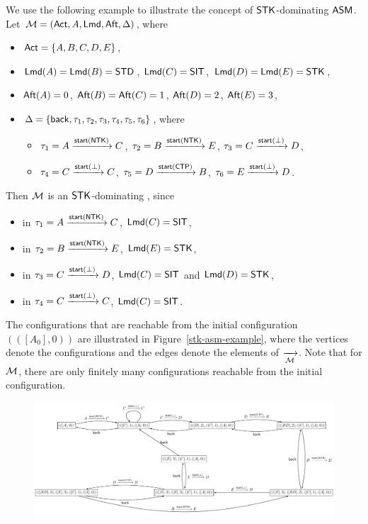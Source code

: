 \begin{example}
		We  use the following example to illustrate the concept of $\mathsf{STK}$-dominating $\textsf{ASM}$.
		Let ${\mathcal{M} }=({\sf Act},A,{\sf Lmd},{\sf Aft},\Delta)$, where 
		\begin{itemize}
			\item ${\sf Act} = \{A, B, C, D, E\}$, 
			\item ${\sf Lmd}(A)={\sf Lmd}(B)={\sf STD}$, ${\sf Lmd}(C) = {\sf SIT}$, ${\sf Lmd}(D) = {\sf Lmd}(E) = {\sf STK}$, 
			\item ${\sf Aft}(A) = 0$, ${\sf Aft}(B) = {\sf Aft}(C) = 1$, ${\sf Aft}(D) = 2$, ${\sf Aft}(E) = 3$, 
			\item $\Delta = \{{\mathsf{back} },\tau_1, \tau_2, \tau_3, \tau_4, \tau_5, \tau_6\}$, where 
			\begin{itemize}
				\item 	$\tau_1 = A \xrightarrow{{\mathsf{start} }({\sf NTK})} C$,
				$\tau_2 = B \xrightarrow{{\mathsf{start} }({\sf NTK})} E$,
				$\tau_3 = C \xrightarrow{{\mathsf{start} }(\bot)} D$,
				\item		$\tau_4 = C \xrightarrow{{\mathsf{start} }(\bot)} C$,
				$\tau_5 = D \xrightarrow{{\mathsf{start} }({\sf CTP})} B$,
				$\tau_6 = E \xrightarrow{{\mathsf{start} }(\bot)} D$. 
			\end{itemize}
		\end{itemize}
		Then ${\mathcal{M} }$ is an $\mathsf{STK}$-dominating {\AMASS}, since
		\begin{itemize}
			\item in $\tau_1 = A \xrightarrow{{\mathsf{start} }({\sf NTK})} C$, ${\sf Lmd}(C) = {\sf SIT}$,  
			\item in $\tau_2 = B \xrightarrow{{\mathsf{start} }({\sf NTK})} E$, ${\sf Lmd}(E) = {\sf STK}$, 
			\item in $\tau_3 = C \xrightarrow{{\mathsf{start} }(\bot)} D$, ${\sf Lmd}(C) = {\sf SIT}$ and ${\sf Lmd}(D) = {\sf STK}$, 
			\item in $\tau_4 = C \xrightarrow{{\mathsf{start} }(\bot)} C$, ${\sf Lmd}(C) = {\sf SIT}$. 
		\end{itemize}
		The configurations that are reachable from the initial configuration $(([A_0], 0))$ are illustrated in Figure~\ref{stk-asm-example}, where the vertices denote the configurations and the edges denote the elements of $\xrightarrow[{\mathcal{M} }]{}$. 
		Note that for ${\mathcal{M} }$, there are only finitely many configurations reachable from the initial configuration.  
\begin{figure}[htbp]
			\centering
			\includegraphics[scale = 0.5]{stk-asm-example.pdf}

\end{figure}
\end{example}
